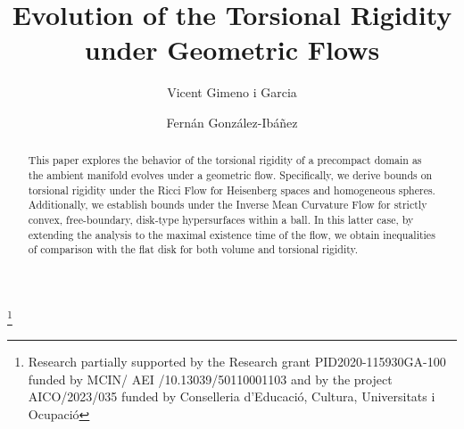 \documentclass{amsart}
\theoremstyle{definition}
\theoremstyle{remark}
\begin{document}
\title[Torsional Rigidity evolution under geometric flows]{ Evolution of the Torsional Rigidity under Geometric Flows}

\author{Vicent Gimeno i Garcia}
\address{Department of Mathematics, Universitat Jaume I-IMAC,   E-12071, 
Castell\'{o}, Spain}



\author{Fernán Gonz\' alez-Ib\' a\~nez}
\address{Department of Mathematics, Universitat Jaume I,   E-12071, 
Castell\'{o}, Spain}



\thanks{Research partially supported by the Research grant  PID2020-115930GA-100 funded by MCIN/ AEI /10.13039/50110001103 and  by the project AICO/2023/035 funded by Conselleria
d’Educació, Cultura, Universitats i Ocupació}





\dedicatory{}



\begin{abstract}This paper explores the behavior of the torsional rigidity of a precompact domain as the ambient manifold evolves under a geometric flow. Specifically, we derive bounds on torsional rigidity under the Ricci Flow for Heisenberg spaces and homogeneous spheres. Additionally, we establish bounds under the Inverse Mean Curvature Flow for strictly convex, free-boundary, disk-type hypersurfaces within a ball. In this latter case, by extending the analysis to the maximal existence time of the flow, we obtain inequalities of comparison  with the flat disk for both volume and torsional rigidity.
\end{abstract}

\maketitle
\tableofcontents

\end{document}
